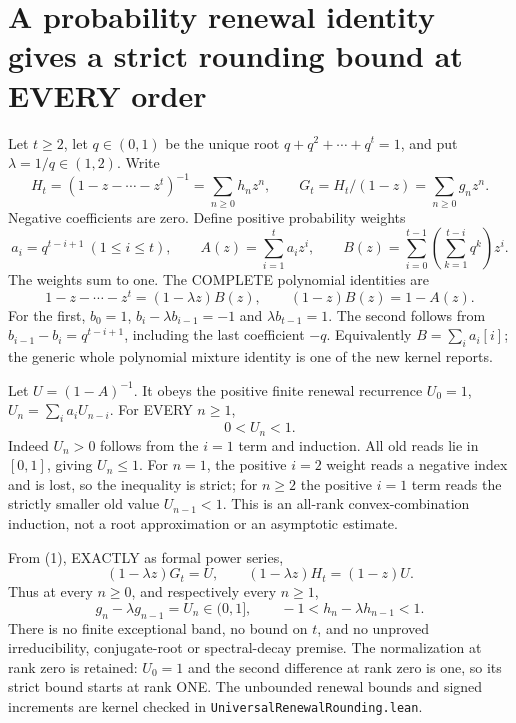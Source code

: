 \section{A probability renewal identity gives a strict rounding bound at EVERY order}
Let $t\ge2$, let $q\in(0,1)$ be the unique root
$q+q^2+\cdots+q^t=1$, and put $\lambda=1/q\in(1,2)$.
Write
\[
 H_t=(1-z-\cdots-z^t)^{-1}=\sum_{n\ge0}h_nz^n,\qquad
 G_t=H_t/(1-z)=\sum_{n\ge0}g_nz^n.
\]
Negative coefficients are zero. Define positive probability weights
\[
 a_i=q^{t-i+1}\ (1\le i\le t),\qquad
 A(z)=\sum_{i=1}^t a_i z^i,\qquad
 B(z)=\sum_{i=0}^{t-1}\left(\sum_{k=1}^{t-i}q^k\right)z^i.
\]
The weights sum to one. The COMPLETE polynomial identities are
\[
 1-z-\cdots-z^t=(1-\lambda z)B(z),\qquad
 (1-z)B(z)=1-A(z).                              \tag{1}
\]
For the first, $b_0=1$, $b_i-\lambda b_{i-1}=-1$ and
$\lambda b_{t-1}=1$. The second follows from
$b_{i-1}-b_i=q^{t-i+1}$, including the last coefficient $-q$.
Equivalently $B=\sum_i a_i[i]$; the generic whole polynomial
mixture identity is one of the new kernel reports.

Let $U=(1-A)^{-1}$. It obeys the positive finite renewal recurrence
$U_0=1$, $U_n=\sum_i a_iU_{n-i}$. For EVERY $n\ge1$,
\[
                         0<U_n<1.              \tag{2}
\]
Indeed $U_n>0$ follows from the $i=1$ term and induction.
All old reads lie in $[0,1]$, giving $U_n\le1$.
For $n=1$, the positive $i=2$ weight reads a negative index and
is lost, so the inequality is strict; for $n\ge2$ the positive
$i=1$ term reads the strictly smaller old value $U_{n-1}<1$.
This is an all-rank convex-combination induction, not a root
approximation or an asymptotic estimate.

From (1), EXACTLY as formal power series,
\[
 (1-\lambda z)G_t=U,\qquad (1-\lambda z)H_t=(1-z)U.
\]
Thus at every $n\ge0$, and respectively every $n\ge1$,
\[
 g_n-\lambda g_{n-1}=U_n\in(0,1],\qquad
             -1<h_n-\lambda h_{n-1}<1.          \tag{3}
\]
There is no finite exceptional band, no bound on $t$, and no
unproved irreducibility, conjugate-root or spectral-decay premise.
The normalization at rank zero is retained: $U_0=1$ and the
second difference at rank zero is one, so its strict bound starts
at rank ONE. The unbounded renewal bounds and signed increments
are kernel checked in \texttt{UniversalRenewalRounding.lean}.

